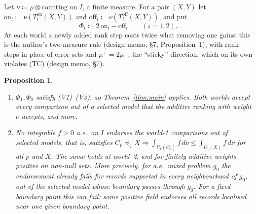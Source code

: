 \documentclass[11pt]{article}
\newtheorem{proposition}[theorem]{Proposition}
\theoremstyle{definition}\newtheorem{definition}[theorem]{Definition}
\theoremstyle{remark}\newtheorem{remark}[theorem]{Remark}
\newcommand{\on}{\mathrm{on}}
\newcommand{\off}{\mathrm{off}}
\begin{document}
Let $\nu\coloneqq\mu\otimes$counting on $I$, a finite measure. For a pair
$(X,Y)$ let $\on_i\coloneqq\nu(T^\on_i(X,Y))$ and
$\off_i\coloneqq\nu(T^\off_i(X,Y))$, and put
\[
 \Phi_i\coloneqq2\,\on_i-\off_i\qquad(i=1,2).
\]
At each world a newly added rank step costs twice what removing one gains:
this is the author's two-measure rule (design memo, \S7, Proposition~1), with
rank steps in place of error sets and $\mu^+=2\mu^-$, the ``sticky''
direction, which on its own violates (TC) (design memo, \S7).

\begin{proposition}\label{prop:instance}
\begin{enumerate}[label=(\alph*),leftmargin=*,itemsep=2pt]
\item $\Phi_1,\Phi_2$ satisfy (V1)--(V3), so Theorem~\ref{thm:main} applies.
Both worlds accept every comparison out of a selected model that the additive
ranking with weight $\nu$ accepts, and more.
\item No integrable $f>0$ a.e.\ on $I$ endorses the world-1 comparisons out of
selected models, that is, satisfies
$C_p\preceq_1X\Rightarrow\int_{U_1(C_p)}f\,d\nu\le\int_{U_1(X)}f\,d\nu$ for all
$p$ and $X$. The same holds at world~2, and for finitely additive weights
positive on non-null sets. More precisely, for a.e.\ mixed problem $g_0$ the
endorsement already fails for records supported in every neighbourhood of
$g_0$, out of the selected model whose boundary passes through $g_0$. For a
\emph{fixed} boundary point this can fail: some positive field endorses all
records localised near one given boundary point.
\end{enumerate}
\end{proposition}
\end{document}
